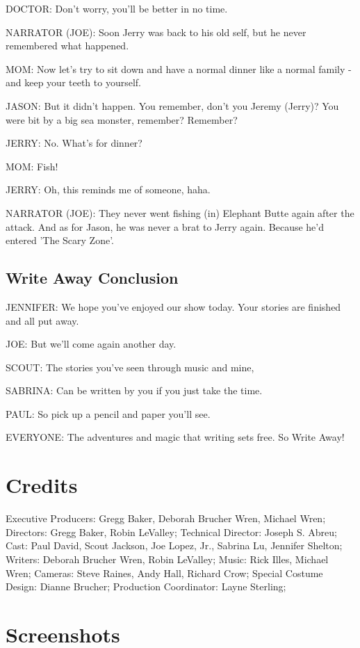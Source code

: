 DOCTOR:
Don't worry, you'll be better in no time.

NARRATOR (JOE):
Soon Jerry was back to his old self, but he never remembered what happened.

MOM:
Now let's try to sit down and have a normal dinner like a normal family - and keep your teeth to yourself.

JASON:
But it didn't happen.
You remember, don't you Jeremy (Jerry)?
You were bit by a big sea monster, remember?
Remember?

JERRY:
No.
What's for dinner?

MOM:
Fish!

JERRY:
Oh, this reminds me of someone, haha.

NARRATOR (JOE):
They never went fishing (in) Elephant Butte again after the attack.
And as for Jason, he was never a brat to Jerry again.
Because he'd entered 'The Scary Zone'.

\subsection{Write Away Conclusion}

JENNIFER:
We hope you've enjoyed our show today.
Your stories are finished and all put away.

JOE:
But we'll come again another day.

SCOUT:
The stories you've seen through music and mine,

SABRINA:
Can be written by you if you just take the time.

PAUL:
So pick up a pencil and paper you'll see.

EVERYONE:
The adventures and magic that writing sets free.
So Write Away!

\section{Credits}

Executive Producers: Gregg Baker, Deborah Brucher Wren, Michael Wren;
Directors: Gregg Baker, Robin LeValley;
Technical Director: Joseph S. Abreu;
Cast: Paul David, Scout Jackson, Joe Lopez, Jr., Sabrina Lu, Jennifer Shelton;
Writers: Deborah Brucher Wren, Robin LeValley;
Music: Rick Illes, Michael Wren;
Cameras: Steve Raines, Andy Hall, Richard Crow;
Special Costume Design: Dianne Brucher;
Production Coordinator: Layne Sterling;

\clearpage
\newpage

\section{Screenshots}

